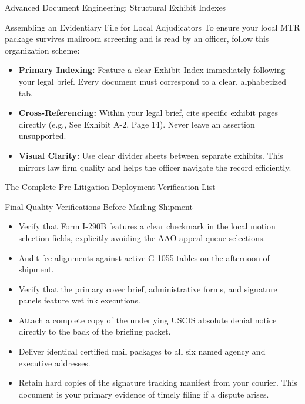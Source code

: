 \documentclass[11pt]{beamer}
\begin{document}
	\begin{frame}{Advanced Document Engineering: Structural Exhibit Indexes}
		\scriptsize
		\begin{block}{Assembling an Evidentiary File for Local Adjudicators}
			To ensure your local MTR package survives mailroom screening and is read by an officer, follow this organization scheme:
			\begin{itemize}
				\item \textbf{Primary Indexing:} Feature a clear Exhibit Index immediately following your legal brief. Every document must correspond to a clear, alphabetized tab.
				\item \textbf{Cross-Referencing:} Within your legal brief, cite specific exhibit pages directly (e.g., See Exhibit A-2, Page 14). Never leave an assertion unsupported.
				\item \textbf{Visual Clarity:} Use clear divider sheets between separate exhibits. This mirrors law firm quality and helps the officer navigate the record efficiently.
			\end{itemize}
		\end{block}
	\end{frame}
	
	\begin{frame}{The Complete Pre-Litigation Deployment Verification List}
		\scriptsize
		\begin{block}{Final Quality Verifications Before Mailing Shipment}
			\begin{itemize}
				\item [$\square$] Verify that Form I-290B features a clear checkmark in the local motion selection fields, explicitly avoiding the AAO appeal queue selections.
				\item [$\square$] Audit fee alignments against active G-1055 tables on the afternoon of shipment.
				\item [$\square$] Verify that the primary cover brief, administrative forms, and signature panels feature wet ink executions.
				\item [$\square$] Attach a complete copy of the underlying USCIS absolute denial notice directly to the back of the briefing packet.
				\item [$\square$] Deliver identical certified mail packages to all six named agency and executive addresses.
				\item [$\square$] Retain hard copies of the signature tracking manifest from your courier. This document is your primary evidence of timely filing if a dispute arises.
			\end{itemize}
		\end{block}
	\end{frame}
	
\end{document}
